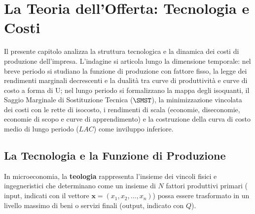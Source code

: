 \chapter{La Teoria dell'Offerta: Tecnologia e Costi}
\label{chap:tecnologia_costi}

\begin{tcolorbox}[colback=navyblue!5!white, colframe=navyblue, title=\textbf{Quadro Concettuale del Capitolo}]
Il presente capitolo analizza la struttura tecnologica e la dinamica dei costi di produzione dell'impresa. L'indagine si articola lungo la dimensione temporale: nel breve periodo si studiano la funzione di produzione con fattore fisso, la legge dei rendimenti marginali decrescenti e la dualità tra curve di produttività e curve di costo a forma di U; nel lungo periodo si formalizzano la mappa degli isoquanti, il Saggio Marginale di Sostituzione Tecnica ($\SMST$), la minimizzazione vincolata dei costi con le rette di isocosto, i rendimenti di scala (economie, diseconomie, economie di scopo e curve di apprendimento) e la costruzione della curva di costo medio di lungo periodo ($LAC$) come inviluppo inferiore.
\end{tcolorbox}

\section{La Tecnologia e la Funzione di Produzione}

In microeconomia, la \textbf{teologia} rappresenta l'insieme dei vincoli fisici e ingegneristici che determinano come un insieme di $N$ fattori produttivi primari ($\text{input}$, indicati con il vettore $\bm{x} = (x_1, x_2, \dots, x_n)$) possa essere trasformato in un livello massimo di beni o servizi finali ($\text{output}$, indicato con $Q$).

